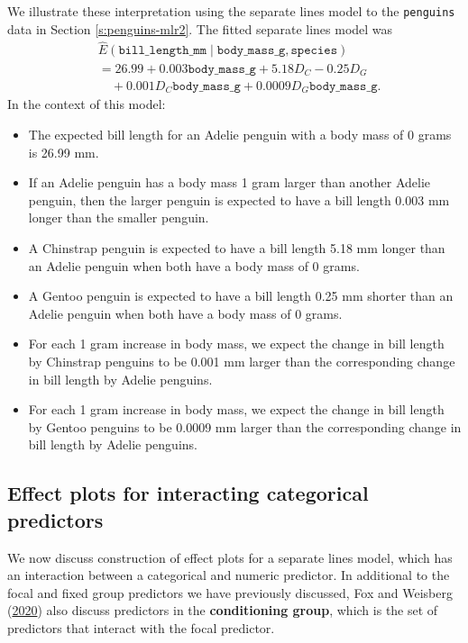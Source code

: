 \documentclass[
]{book}
\providecommand{\tightlist}{%
  \setlength{\itemsep}{0pt}\setlength{\parskip}{0pt}}
\theoremstyle{definition}
\theoremstyle{definition}
\theoremstyle{definition}
\theoremstyle{definition}
\theoremstyle{remark}
\begin{document}
We illustrate these interpretation using the separate lines model to the
\texttt{penguins} data in Section \ref{s:penguins-mlr2}. The fitted
separate lines model was \[
\begin{aligned}
&\hat{E}(\mathtt{bill\_length\_mm} \mid \mathtt{body\_mass\_g}, \mathtt{species}) \\
&= 26.99 + 0.003 \mathtt{body\_mass\_g} + 5.18 D_C - 0.25 D_G \\
&\quad + 0.001 D_C \mathtt{body\_mass\_g} + 0.0009 D_G \mathtt{body\_mass\_g}.
\end{aligned}
\label{eq:sl-refit-interp}
\] In the context of this model:

\begin{itemize}
\tightlist
\item
  The expected bill length for an Adelie penguin with a body mass of 0
  grams is 26.99 mm.
\item
  If an Adelie penguin has a body mass 1 gram larger than another
  Adelie penguin, then the larger penguin is expected to have a bill
  length 0.003 mm longer than the smaller penguin.
\item
  A Chinstrap penguin is expected to have a bill length 5.18 mm longer
  than an Adelie penguin when both have a body mass of 0 grams.
\item
  A Gentoo penguin is expected to have a bill length 0.25 mm shorter
  than an Adelie penguin when both have a body mass of 0 grams.
\item
  For each 1 gram increase in body mass, we expect the change in bill
  length by Chinstrap penguins to be 0.001 mm larger than the
  corresponding change in bill length by Adelie penguins.
\item
  For each 1 gram increase in body mass, we expect the change in bill
  length by Gentoo penguins to be 0.0009 mm larger than the
  corresponding change in bill length by Adelie penguins.
\end{itemize}

\hypertarget{effect-plots-for-interacting-categorical-predictors}{%
\subsection{Effect plots for interacting categorical predictors}\label{effect-plots-for-interacting-categorical-predictors}}

We now discuss construction of effect plots for a separate lines model,
which has an interaction between a categorical and numeric predictor. In
additional to the focal and fixed group predictors we have previously
discussed, Fox and Weisberg (\protect\hyperlink{ref-fox2020predictor}{2020}) also discuss predictors in the
\textbf{conditioning group}, which is the set of predictors that interact
with the focal predictor.
\end{document}
